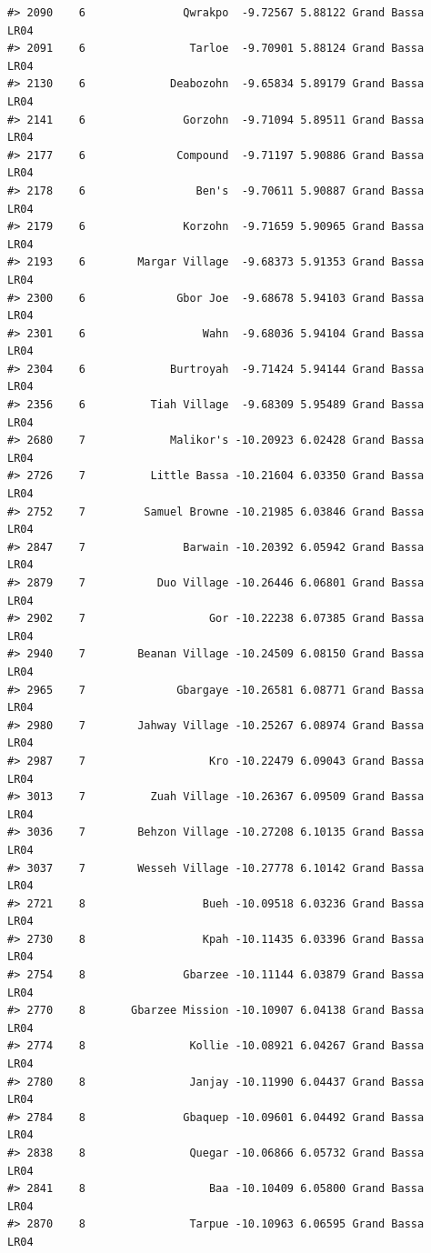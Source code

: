 \documentclass[12pt,a4paper]{book}
\theoremstyle{definition}
\theoremstyle{definition}
\theoremstyle{definition}
\theoremstyle{remark}
\begin{document}
\begin{verbatim}
#> 2090    6               Qwrakpo  -9.72567 5.88122 Grand Bassa       LR04
#> 2091    6                Tarloe  -9.70901 5.88124 Grand Bassa       LR04
#> 2130    6             Deabozohn  -9.65834 5.89179 Grand Bassa       LR04
#> 2141    6               Gorzohn  -9.71094 5.89511 Grand Bassa       LR04
#> 2177    6              Compound  -9.71197 5.90886 Grand Bassa       LR04
#> 2178    6                 Ben's  -9.70611 5.90887 Grand Bassa       LR04
#> 2179    6               Korzohn  -9.71659 5.90965 Grand Bassa       LR04
#> 2193    6        Margar Village  -9.68373 5.91353 Grand Bassa       LR04
#> 2300    6              Gbor Joe  -9.68678 5.94103 Grand Bassa       LR04
#> 2301    6                  Wahn  -9.68036 5.94104 Grand Bassa       LR04
#> 2304    6             Burtroyah  -9.71424 5.94144 Grand Bassa       LR04
#> 2356    6          Tiah Village  -9.68309 5.95489 Grand Bassa       LR04
#> 2680    7             Malikor's -10.20923 6.02428 Grand Bassa       LR04
#> 2726    7          Little Bassa -10.21604 6.03350 Grand Bassa       LR04
#> 2752    7         Samuel Browne -10.21985 6.03846 Grand Bassa       LR04
#> 2847    7               Barwain -10.20392 6.05942 Grand Bassa       LR04
#> 2879    7           Duo Village -10.26446 6.06801 Grand Bassa       LR04
#> 2902    7                   Gor -10.22238 6.07385 Grand Bassa       LR04
#> 2940    7        Beanan Village -10.24509 6.08150 Grand Bassa       LR04
#> 2965    7              Gbargaye -10.26581 6.08771 Grand Bassa       LR04
#> 2980    7        Jahway Village -10.25267 6.08974 Grand Bassa       LR04
#> 2987    7                   Kro -10.22479 6.09043 Grand Bassa       LR04
#> 3013    7          Zuah Village -10.26367 6.09509 Grand Bassa       LR04
#> 3036    7        Behzon Village -10.27208 6.10135 Grand Bassa       LR04
#> 3037    7        Wesseh Village -10.27778 6.10142 Grand Bassa       LR04
#> 2721    8                  Bueh -10.09518 6.03236 Grand Bassa       LR04
#> 2730    8                  Kpah -10.11435 6.03396 Grand Bassa       LR04
#> 2754    8               Gbarzee -10.11144 6.03879 Grand Bassa       LR04
#> 2770    8       Gbarzee Mission -10.10907 6.04138 Grand Bassa       LR04
#> 2774    8                Kollie -10.08921 6.04267 Grand Bassa       LR04
#> 2780    8                Janjay -10.11990 6.04437 Grand Bassa       LR04
#> 2784    8               Gbaquep -10.09601 6.04492 Grand Bassa       LR04
#> 2838    8                Quegar -10.06866 6.05732 Grand Bassa       LR04
#> 2841    8                   Baa -10.10409 6.05800 Grand Bassa       LR04
#> 2870    8                Tarpue -10.10963 6.06595 Grand Bassa       LR04

\end{verbatim}
\end{document}

